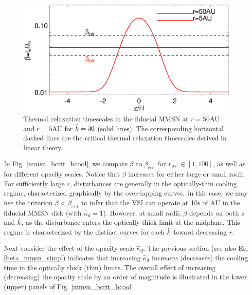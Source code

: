 
\begin{figure}
  \includegraphics[width=\linewidth,clip=true,trim=0cm 0cm 0cm
  0cm]{figures/beta_compare}
  \caption{Thermal relaxation timescales in the fiducial MMSN at $r=50$AU
    and $r=5$AU for $\hat{k}=30$ (solid lines). The
    corresponding horizontal dashed lines are the critical thermal
    relaxation timescales derived in linear theory. 
    \label{beta_compare}}
\end{figure}


In Fig. \ref{mmsn_bcrit_bcool}, we compare $\beta$ to
$\beta_\mathrm{crit}$ for $r_\mathrm{AU}\in[1,100]$, as well as for different
opacity scales. Notice that $\beta$ increases for either large or
small radii. For sufficiently large $r$, disturbances are generally
in the optically-thin cooling regime, characterized graphically by the
over-lapping curves. 
In this case, we may use the criterion $\beta<\beta_\mathrm{crit}$ to
infer that the VSI can operate at 10s of AU in the fiducial MMSN disk (with
$\hat{\kappa}_d=1$).  However, at small radii, $\beta$ depends on both
$z$ and $\hat{k}$, as the disturbance enters the optically-thick limit
at the midplane. This regime is characterized by the distinct curves for each
$\hat{k}$ toward decreasing $r$.  
  
 
Next consider the effect of the opacity scale $\hat{\kappa}_d$. The previous section
(see also Eq. \ref{beta_mmsn_simp}) indicates that increasing $\hat{\kappa}_d$
increases (decreases) the cooling time in the optically thick (thin)
limits. The overall effect of  increasing (decreasing) the opacity
scale by an order of magnitude is illustrated in the lower (upper)
panels of Fig. \ref{mmsn_bcrit_bcool}. 

